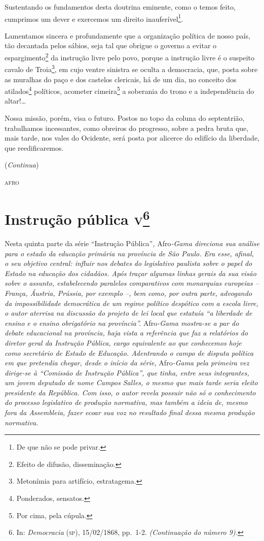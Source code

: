 Sustentando os fundamentos desta doutrina eminente, como o temos feito,
cumprimos um dever e exercemos um direito inauferível\footnote{De que
  não se pode privar.}.

Lamentamos sincera e profundamente que a organização política de nosso
país, tão decantada pelos sábios, seja tal que obrigue o governo a
evitar o espargimento\footnote{Efeito de difusão, disseminação.} da
instrução livre pelo povo, porque a instrução livre é o suspeito cavalo
de Troia\footnote{Metonímia para artifício, estratagema.}, em cujo
ventre sinistra se oculta a democracia, que, posta sobre as muralhas do
paço e dos castelos clericais, há de um dia, no conceito dos
atilados\footnote{Ponderados, sensatos.} políticos, acometer
cimeira\footnote{Por cima, pela cúpula.} a soberania do trono e a
independência do altar!\ldots{}

Nossa missão, porém, visa o futuro. Postos no topo da coluna do
septentrião, trabalhamos incessantes, como obreiros do progresso, sobre
a pedra bruta que, mais tarde, nos vales do Ocidente, será posta por
alicerce do edifício da liberdade, que reedificaremos.

(\emph{Continua})
\begin{flushright}
\textsc{afro}
\end{flushright}
\chapter{Instrução pública \textsc{v}\footnote{In: \emph{Democracia} (\textsc{sp}),
  15/02/1868, pp.~1-2. \emph{(Continuação do número 9).}}}

\begin{didascalia}
Nesta quinta parte da série ``Instrução Pública''\emph{,} Afro\emph{-Gama
direciona sua análise para o estado da educação primária na província de
São Paulo. Era esse, afinal, o seu objetivo central: influir nos debates
do legislativo paulista sobre o papel do Estado na educação dos
cidadãos. Após traçar algumas linhas gerais da sua visão sobre o
assunto, estabelecendo paralelos comparativos com monarquias europeias
-- França, Áustria, Prússia, por exemplo --, bem como, por outra parte,
advogando da impossibilidade democrática de um regime político despótico
com a escola livre, o autor aterrisa na discussão do projeto de lei
local que estatuía ``a liberdade de ensino e o ensino obrigatório na
província''.} Afro\emph{-Gama mostra-se a par do debate educacional na
província, haja vista a referência que faz a relatórios do diretor geral
da Instrução Pública, cargo equivalente ao que conhecemos hoje como
secretário de Estado de Educação. Adentrando o campo de disputa política
em que pretendia chegar, desde o início da série,} Afro\emph{-Gama pela
primeira vez dirige-se à ``Comissão de Instrução Pública'', que tinha,
entre seus integrantes, um jovem deputado de nome Campos Salles, o mesmo
que mais tarde seria eleito presidente da República. Com isso, o autor
revela possuir não só o conhecimento do processo legislativo de produção
normativa, mas também a ideia de, mesmo fora da Assembleia, fazer ecoar
sua voz no resultado final dessa mesma produção normativa.}
\end{didascalia}



